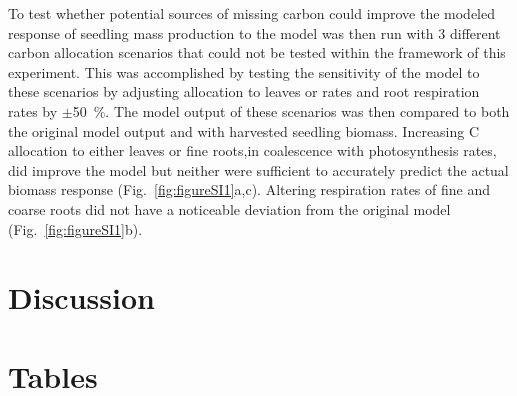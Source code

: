 \documentclass[a4paper]{article}\usepackage[]{graphicx}\usepackage[]{color}
\begin{document}
To test whether potential sources of missing carbon could improve the modeled response of seedling mass production to the model was then run with 3 different carbon allocation scenarios that could not be tested within the framework of this experiment. This was accomplished by testing the sensitivity of the model to these scenarios by adjusting allocation to leaves or rates and root respiration rates by $\pm$50~\%. The model output of these scenarios was then compared to both the original model output and with harvested seedling biomass.  Increasing C allocation to either leaves or fine roots,in coalescence with photosynthesis rates, did improve the model but neither were sufficient to accurately predict the actual biomass response  (Fig.~\ref{fig:figureSI1}a,c). Altering respiration rates of fine and coarse roots did not have a noticeable deviation from the original model (Fig.~\ref{fig:figureSI1}b).

\section*{Discussion}


\section*{Tables}
\end{document}
